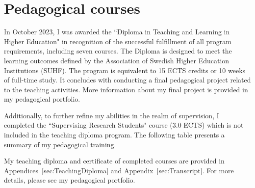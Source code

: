 \newpage
\section{Pedagogical courses}{}

In October 2023, I was awarded the ``Diploma in Teaching and Learning in Higher Education" in recognition of the successful fulfillment of all program requirements, including seven courses. The Diploma is designed to meet the learning outcomes defined by the Association of Swedish Higher Education Institutions (SUHF). The program is equivalent to 15 ECTS credits or 10 weeks of full-time study. It concludes with conducting a final pedagogical project related to the teaching activities. More information about my final project is provided in my pedagogical portfolio.

Additionally, to further refine my abilities in the realm of supervision, I completed the ``Supervising Research Students" course (3.0 ECTS) which is not included in the teaching diploma program. The following table presents a summary of my pedagogical training.

My teaching diploma and certificate of completed courses are provided in Appendices~\ref{sec:TeachingDiploma} and Appendix~\ref{sec:Transcript}. For more details, please see my pedagogical portfolio.
%

